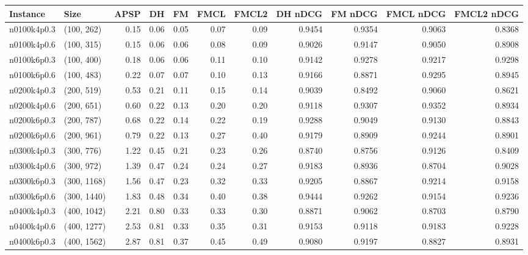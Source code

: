 \begin{tabular}{llrrrrrrrrr}
\toprule
   Instance &          Size &    APSP &     DH &    FM &  FMCL &  FMCL2 &  DH nDCG &  FM nDCG &  FMCL nDCG &  FMCL2 nDCG \\
\midrule
n0100k4p0.3 &    (100, 262) &    0.15 &   0.06 &  0.05 &  0.07 &   0.09 &   0.9454 &   0.9354 &     0.9063 &      0.8368 \\
n0100k4p0.6 &    (100, 315) &    0.15 &   0.06 &  0.06 &  0.08 &   0.09 &   0.9026 &   0.9147 &     0.9050 &      0.8908 \\
n0100k6p0.3 &    (100, 400) &    0.18 &   0.06 &  0.06 &  0.11 &   0.10 &   0.9142 &   0.9278 &     0.9217 &      0.9298 \\
n0100k6p0.6 &    (100, 483) &    0.22 &   0.07 &  0.07 &  0.10 &   0.13 &   0.9166 &   0.8871 &     0.9295 &      0.8945 \\
n0200k4p0.3 &    (200, 519) &    0.53 &   0.21 &  0.11 &  0.15 &   0.14 &   0.9039 &   0.8492 &     0.9060 &      0.8621 \\
n0200k4p0.6 &    (200, 651) &    0.60 &   0.22 &  0.13 &  0.20 &   0.20 &   0.9118 &   0.9307 &     0.9352 &      0.8934 \\
n0200k6p0.3 &    (200, 787) &    0.68 &   0.22 &  0.14 &  0.22 &   0.19 &   0.9288 &   0.9049 &     0.9130 &      0.8843 \\
n0200k6p0.6 &    (200, 961) &    0.79 &   0.22 &  0.13 &  0.27 &   0.40 &   0.9179 &   0.8909 &     0.9244 &      0.8901 \\
n0300k4p0.3 &    (300, 776) &    1.22 &   0.45 &  0.21 &  0.23 &   0.26 &   0.8740 &   0.8756 &     0.9126 &      0.8409 \\
n0300k4p0.6 &    (300, 972) &    1.39 &   0.47 &  0.24 &  0.24 &   0.27 &   0.9183 &   0.8936 &     0.8704 &      0.9028 \\
n0300k6p0.3 &   (300, 1168) &    1.56 &   0.47 &  0.23 &  0.32 &   0.33 &   0.9205 &   0.8867 &     0.9214 &      0.9158 \\
n0300k6p0.6 &   (300, 1440) &    1.83 &   0.48 &  0.34 &  0.40 &   0.38 &   0.9444 &   0.9262 &     0.9154 &      0.9236 \\
n0400k4p0.3 &   (400, 1042) &    2.21 &   0.80 &  0.33 &  0.33 &   0.30 &   0.8871 &   0.9062 &     0.8703 &      0.8790 \\
n0400k4p0.6 &   (400, 1277) &    2.53 &   0.81 &  0.33 &  0.35 &   0.31 &   0.9153 &   0.9118 &     0.9183 &      0.9228 \\
n0400k6p0.3 &   (400, 1562) &    2.87 &   0.81 &  0.37 &  0.45 &   0.49 &   0.9080 &   0.9197 &     0.8827 &      0.8931 \\

\end{tabular}

